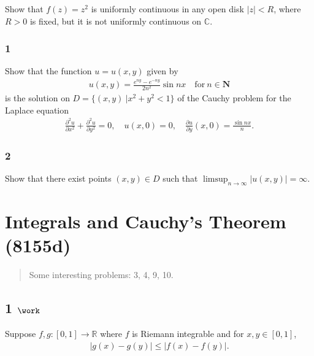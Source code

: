 Show that \(f(z) = z^2\) is uniformly continuous in any open disk
\(|z| < R\), where \(R>0\) is fixed, but it is not uniformly continuous
on \(\mathbb C\).

\hypertarget{section-2}{%
\subsubsection{1}\label{section-2}}

Show that the function \(u=u(x,y)\) given by
\begin{align*}
u(x,y)=\frac{e^{ny}-e^{-ny}}{2n^2}\sin nx\quad \text{for}\ n\in {\mathbf N}
\end{align*}
is the solution on \(D=\{(x,y)\ | x^2+y^2<1\}\) of the Cauchy problem
for the Laplace equation
\begin{align*}\frac{\partial ^2u}{\partial x^2}+\frac{\partial ^2u}{\partial y^2}=0,\quad
u(x,0)=0,\quad \frac{\partial u}{\partial y}(x,0)=\frac{\sin nx}{n}.\end{align*}

\hypertarget{section-3}{%
\subsubsection{2}\label{section-3}}

Show that there exist points \((x,y)\in D\) such that
\(\displaystyle{\limsup_{n\to\infty} |u(x,y)|=\infty}\).

\hypertarget{integrals-and-cauchys-theorem-8155d}{%
\section{Integrals and Cauchy's Theorem
(8155d)}\label{integrals-and-cauchys-theorem-8155d}}

\begin{quote}
Some interesting problems: 3, 4, 9, 10.
\end{quote}

\hypertarget{work-16}{%
\subsection{\texorpdfstring{1
\(\work\)}{1 \textbackslash work}}\label{work-16}}

Suppose \(f, g: [0, 1] \to {\mathbb{R}}\) where \(f\) is Riemann
integrable and for \(x, y\in [0, 1]\),
\begin{align*}
{\left\lvert {g(x) - g(y)} \right\rvert} \leq {\left\lvert {f(x) - f(y)} \right\rvert}
.\end{align*}

